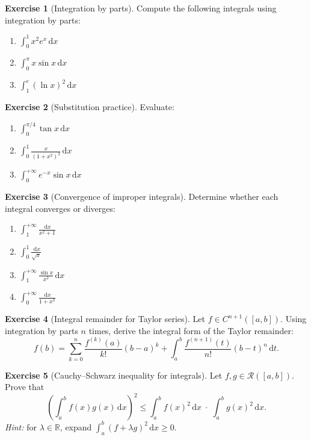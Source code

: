 \documentclass[12pt,a4paper]{book}
\theoremstyle{definition}
\newtheorem{exercise}{Exercise}[chapter]
\newcommand{\R}{\mathbb{R}}
\newcommand{\dd}{\,\mathrm{d}}
\begin{document}
\begin{exercise}[Integration by parts]\label{exo:exer-ibp}
  Compute the following integrals using integration by parts:
  \begin{enumerate}[label=(\alph*)]
    \item $\displaystyle\int_0^1 x^2 e^x\dd x$
    \item $\displaystyle\int_0^{\pi} x\sin x\dd x$
    \item $\displaystyle\int_1^e (\ln x)^2\dd x$
  \end{enumerate}
\end{exercise}

\begin{exercise}[Substitution practice]\label{exo:exer-subst}
  Evaluate:
  \begin{enumerate}[label=(\alph*)]
    \item $\displaystyle\int_0^{\pi/4}\tan x\dd x$
    \item $\displaystyle\int_0^1 \frac{x}{(1+x^2)^2}\dd x$
    \item $\displaystyle\int_0^{+\infty} e^{-x}\sin x\dd x$
  \end{enumerate}
\end{exercise}

\begin{exercise}[Convergence of improper integrals]\label{exo:exer-improper-conv}
  Determine whether each integral converges or diverges:
  \begin{enumerate}[label=(\alph*)]
    \item $\displaystyle\int_1^{+\infty}\frac{\dd x}{x^2+1}$
    \item $\displaystyle\int_0^1\frac{\dd x}{\sqrt{x}}$
    \item $\displaystyle\int_1^{+\infty}\frac{\sin x}{x^2}\dd x$
    \item $\displaystyle\int_0^{+\infty}\frac{\dd x}{1+x^3}$
  \end{enumerate}
\end{exercise}

\begin{exercise}[Integral remainder for Taylor series]\label{exo:exer-taylor-remainder}
  Let $f\in C^{n+1}([a,b])$.  Using integration by parts $n$ times,
  derive the integral form of the Taylor remainder:
  \[
    f(b)=\sum_{k=0}^n \frac{f^{(k)}(a)}{k!}(b-a)^k
    + \int_a^b \frac{f^{(n+1)}(t)}{n!}(b-t)^n\dd t.
  \]
\end{exercise}

\begin{exercise}[Cauchy--Schwarz inequality for integrals]\label{exo:exer-CS}
  Let $f,g\in\mathcal{R}([a,b])$.  Prove that
  \[
    \left(\int_a^b f(x)g(x)\dd x\right)^2
    \le \int_a^b f(x)^2\dd x\;\cdot\;\int_a^b g(x)^2\dd x.
  \]
  \emph{Hint:} for $\lambda\in\R$, expand
  $\int_a^b(f+\lambda g)^2\dd x\ge0$.
\end{exercise}
\end{document}
